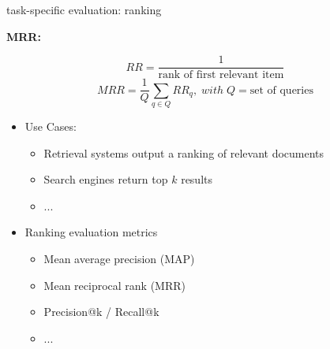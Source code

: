
\begin{vbframe}{task-specific evaluation: ranking}

\vfill

\textbf{MRR:}

$$RR = \dfrac{1}{\text{rank of first relevant item}}$$
$$MRR = \dfrac{1}{Q} \sum_{q \in Q} RR_q,\; with\; Q = \text{set of queries}$$

\begin{itemize}
		\item Use Cases:
				\begin{itemize}
					\item Retrieval systems output a ranking of relevant documents
					\item Search engines return top $k$ results
					\item ...
				\end{itemize}
		\item Ranking evaluation metrics
				\begin{itemize}
					\item Mean average precision (MAP)
					\item Mean reciprocal rank (MRR)
					\item Precision@k / Recall@k
					\item ...
				\end{itemize}
\end{itemize}
\vfill

\end{vbframe}


\endlecture
